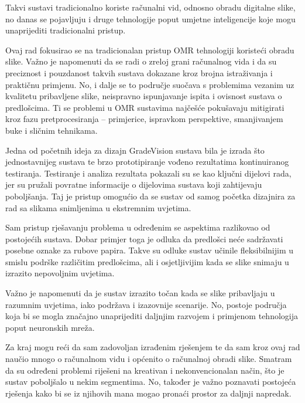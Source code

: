\documentclass{foi}
\begin{document}
Takvi sustavi tradicionalno koriste računalni vid, odnosno obradu digitalne slike, no danas se pojavljuju i druge tehnologije poput umjetne inteligencije koje mogu unaprijediti tradicionalni pristup.

Ovaj rad fokusirao se na tradicionalan pristup OMR tehnologiji koristeći obradu slike. Važno je napomenuti da se radi o zreloj grani računalnog vida i da su preciznost i pouzdanost takvih sustava dokazane kroz brojna istraživanja i praktičnu primjenu. No, i dalje se to područje suočava s problemima vezanim uz kvalitetu pribavljene slike, neispravno ispunjavanje ispita i ovisnost sustava o predlošcima. Ti se problemi u OMR sustavima najčešće pokušavaju mitigirati kroz fazu pretprocesiranja – primjerice, ispravkom perspektive, smanjivanjem buke i sličnim tehnikama.

Jedna od početnih ideja za dizajn GradeVision sustava bila je izrada što jednostavnijeg sustava te brzo prototipiranje vođeno rezultatima kontinuiranog testiranja. Testiranje i analiza rezultata pokazali su se kao ključni dijelovi rada, jer su pružali povratne informacije o dijelovima sustava koji zahtijevaju poboljšanja. Taj je pristup omogućio da se sustav od samog početka dizajnira za rad sa slikama snimljenima u ekstremnim uvjetima.

Sam pristup rješavanju problema u određenim se aspektima razlikovao od postojećih sustava. Dobar primjer toga je odluka da predlošci neće sadržavati posebne oznake za rubove papira. Takve su odluke sustav učinile fleksibilnijim u smislu podrške različitim predlošcima, ali i osjetljivijim kada se slike snimaju u izrazito nepovoljnim uvjetima.

Važno je napomenuti da je sustav izrazito točan kada se slike pribavljaju u razumnim uvjetima, iako podržava i izazovnije scenarije. No, postoje područja koja bi se mogla značajno unaprijediti daljnjim razvojem i primjenom tehnologija poput neuronskih mreža.

Za kraj mogu reći da sam zadovoljan izrađenim rješenjem te da sam kroz ovaj rad naučio mnogo o računalnom vidu i općenito o računalnoj obradi slike. Smatram da su određeni problemi riješeni na kreativan i nekonvencionalan način, što je sustav poboljšalo u nekim segmentima. No, također je važno poznavati postojeća rješenja kako bi se iz njihovih mana mogao pronaći prostor za daljnji napredak.

\printbibliography[title=Popis literature]

\listoffigures
{}
 
\end{document}
